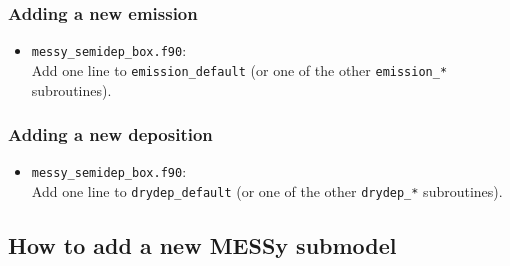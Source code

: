 \documentclass[twoside]{article}
\def\nosep{\setlength\parsep{0mm}\setlength\topsep{0mm}\setlength\itemsep{0mm}}
\begin{document}
\subsubsection{Adding a new emission}

\begin{itemize}\nosep
\item \verb|messy_semidep_box.f90|:\\
  Add one line to \verb|emission_default| (or one of the other
  \verb|emission_*| subroutines).
\end{itemize}

\subsubsection{Adding a new deposition}

\begin{itemize}\nosep
\item \verb|messy_semidep_box.f90|:\\
  Add one line to \verb|drydep_default| (or one of the other
  \verb|drydep_*| subroutines).
\end{itemize}

\subsection{How to add a new MESSy submodel}
\end{document}
